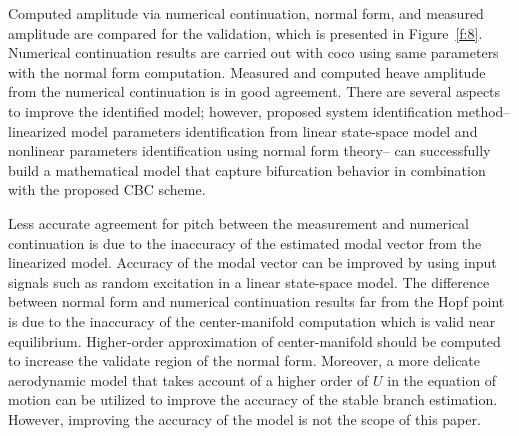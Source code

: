 \documentclass[openacc]{rsproca_new}%
\newcommand{\Fref}[1]{Figure~\ref{#1}}
\begin{document}
Computed amplitude via numerical continuation, normal form, and measured amplitude are compared for the validation, which is presented in \Fref{f:8}. Numerical continuation results are carried out with coco \cite{dankowicz2013recipes} using same parameters with the normal form computation. Measured and computed heave amplitude from the numerical continuation is in good agreement. There are several aspects to improve the identified model; however, proposed system identification method-- linearized model parameters identification from linear state-space model and nonlinear parameters identification using normal form theory-- can successfully build a mathematical model that capture bifurcation behavior in combination with the proposed CBC scheme.

Less accurate agreement for pitch between the measurement and numerical continuation is due to the inaccuracy of the estimated modal vector from the linearized model. Accuracy of the modal vector can be improved by using input signals such as random excitation in a linear state-space model. The difference between normal form and numerical continuation results far from the Hopf point is due to the inaccuracy of the center-manifold computation which is valid near equilibrium. Higher-order approximation of center-manifold should be computed to increase the validate region of the normal form. Moreover, a more delicate aerodynamic model that takes account of a higher order of $U$ in the equation of motion can be utilized to improve the accuracy of the stable branch estimation. However, improving the accuracy of the model is not the scope of this paper.
\end{document}
